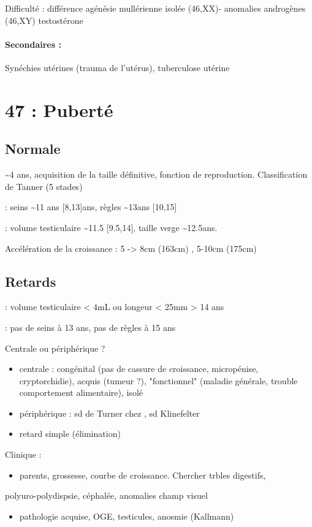 \documentclass[11pt]{article}
\begin{document}
Difficulté : différence agénésie mullérienne isolée (46,XX)- anomalies androgènes
(46,XY) \thus testostérone
\paragraph{Secondaires :}
\label{sec:orgfdde1b7}
Synéchies utérines (trauma de l'utérus), tuberculose utérine
\section{47 : Puberté}
\label{sec:org38627ae}
\subsection{Normale}
\label{sec:org391ebc4}
\textasciitilde{}4 ans, acquisition de la taille définitive, fonction de
reproduction. Classification de Tanner (5 stades)

\female : seins \textasciitilde{}11 ans [8,13]ans, règles \textasciitilde{}13ans [10,15]

\male : \inc volume testiculaire \textasciitilde{}11.5 [9.5,14], \inc taille verge \textasciitilde{}12.5ans.

Accélération de la croissance : 5 -> 8cm (163cm) \female, 5-10cm (175cm)
\subsection{Retards}
\label{sec:org3c8713a}
\male :  volume testiculaire < 4mL ou longeur < 25mm > 14 ans 

\female : pas de seins à 13 ans, pas de règles à 15 ans

Centrale ou périphérique ?
\begin{itemize}
\item centrale : congénital (pas de cassure de croissance, micropénise,
cryptorchidie), acquis (tumeur ?), "fonctionnel" (maladie générale, trouble
comportement alimentaire), isolé
\item périphérique : sd de Turner chez \female, sd Klinefelter \male
\item retard simple (élimination)
\end{itemize}

Clinique : 
\begin{itemize}
\item parents, grossesse, courbe de croissance. Chercher trbles digestifs,
\end{itemize}
polyuro-polydispsie, céphalée, anomalies champ visuel
\begin{itemize}
\item pathologie acquise, OGE, testicules, anosmie (Kallmann)
\end{itemize}
\end{document}
